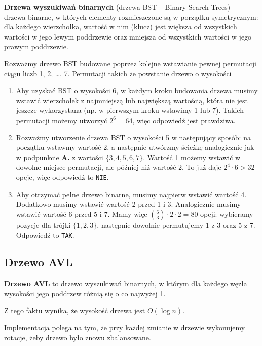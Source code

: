 \textbf{Drzewa wyszukiwań binarnych} (drzewa BST -- Binary Search Trees) -- drzewa binarne, w których elementy rozmieszczone są w porządku symetrycznym: dla każdego wierzchołka, wartość w nim (klucz) jest większa od wszystkich wartości w jego lewym poddrzewie oraz mniejsza od wszystkich wartości w jego prawym poddrzewie.

\begin{exam}
    Rozważmy drzewo BST budowane poprzez kolejne wstawianie pewnej permutacji ciągu liczb 1, 2, …, 7. Permutacji takich że powstanie drzewo o wysokości
    \bigskip

    \begin{enumerate}[\bf A.]
        \item Aby uzyskać BST o wysokości 6, w każdym kroku budowania drzewa musimy wstawić wierzchołek z najmniejszą lub największą wartością, która nie jest jeszcze wykorzystana (np. w pierwszym kroku wstawimy 1 lub 7). Takich permutacji możemy utworzyć $2^6 = 64$, więc odpowiedź jest prawdziwa.

        \item Rozważmy utworzenie drzewa BST o wysokości 5 w następujący sposób: na początku wstawmy wartość 2, a następnie utwórzmy ścieżkę analogicznie jak w podpunkcie \textbf{A.} z wartości $\{3, 4, 5, 6, 7\}$. Wartość 1 możemy wstawić w dowolne miejsce permutacji, ale później niż wartość 2. To już daje $2^4 \cdot 6 > 32$ opcje, więc odpowiedź to \texttt{NIE}.

        \item Aby otrzymać pełne drzewo binarne, musimy najpierw wstawić wartość 4. Dodatkowo musimy wstawić wartość 2 przed 1 i 3. Analogicznie musimy wstawić wartość 6 przed 5 i 7. Mamy więc $\binom{6}{3} \cdot 2 \cdot 2 = 80$ opcji: wybieramy pozycje dla trójki $\{1, 2, 3\}$, następnie dowolnie permutujemy 1 z 3 oraz 5 z 7. Odpowiedź to \texttt{TAK}.
    \end{enumerate}
\end{exam}

\subsection{Drzewo AVL}
\textbf{Drzewo AVL} to drzewo wyszukiwań binarnych, w którym dla każdego węzła wysokości jego poddrzew różnią się o co najwyżej 1.

Z tego faktu wynika, że wysokość drzewa jest $O(\log n)$.

Implementacja polega na tym, że przy każdej zmianie w drzewie wykonujemy rotacje, żeby drzewo było znowu zbalansowane.

